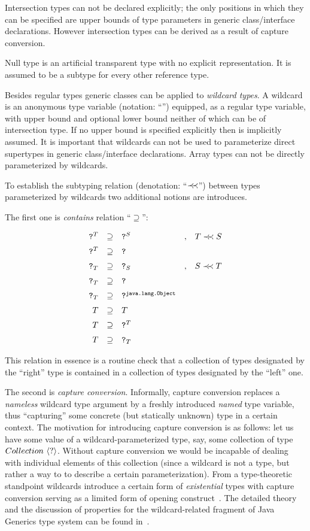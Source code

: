 Intersection types can not be declared explicitly; the only positions in which they can be specified are
upper bounds of type parameters in generic class/interface declarations. However intersection types can be derived
as a result of capture conversion.

Null type is an artificial transparent type with no explicit representation. It is assumed to be a subtype for
every other reference type.

Besides regular types generic classes can be applied to \emph{wildcard types}. A wildcard is an anonymous
type variable (notation: ``'') equipped, as a regular type variable, with upper bound and optional lower bound
neither of which can be of intersection type. If no upper bound is specified explicitly then  is implicitly assumed.
It is important that wildcards can not be used to parameterize direct supertypes in generic class/interface declarations.
Array types can not be directly parameterized by wildcards.

To establish the subtyping relation (denotation: ``$\prec\mathrel{\mkern-5mu}\prec$'') between types parameterized by wildcards two additional
notions are introduces.

The first one is \emph{contains} relation ``$\supseteq$'':

\[
\begin{array}{rclcl}
  \texttt{?}^T&\supseteq&\texttt{?}^S&,&T\prec\mathrel{\mkern-5mu}\prec S \\[2mm]
  \texttt{?}^T&\supseteq&\texttt{?}&& \\[2mm]
  \texttt{?}_T&\supseteq&\texttt{?}_S&,&S\prec\mathrel{\mkern-5mu}\prec T\\[2mm]
  \texttt{?}_T&\supseteq&\texttt{?}&& \\[2mm]
  \texttt{?}_T&\supseteq&\texttt{?}^{\texttt{java.lang.Object}}&& \\[2mm]
  T&\supseteq& T&&\\[2mm]
  T&\supseteq&\texttt{?}^T&&\\[2mm]
  T&\supseteq&\texttt{?}_T&&
\end{array}
\]

This relation in essence is a routine check that a collection of types designated by the ``right'' type is
contained in a collection of types designated by the ``left'' one.

The second is \emph{capture conversion}. Informally, capture conversion replaces a \emph{nameless} wildcard type
argument by a freshly introduced \emph{named} type variable, thus ``capturing'' some concrete (but statically unknown)
type in a certain context. The motivation for introducing capture conversion is as follows: let us have
some value of a wildcard-parameterized type, say, some collection of type ${Collection}\,\left<{?}\right>$. Without capture
conversion we would be incapable of dealing with individual elements of this collection (since a wildcard is not a type,
but rather a way to to describe a certain parameterization). From a type-theoretic standpoint wildcards introduce a
certain form of \emph{existential} types with capture conversion serving as a limited form of opening construct~\cite{tapl}.
The detailed theory and the discussion of properties for the wildcard-related fragment of Java Generics type system
can be found in~\cite{wild}.

